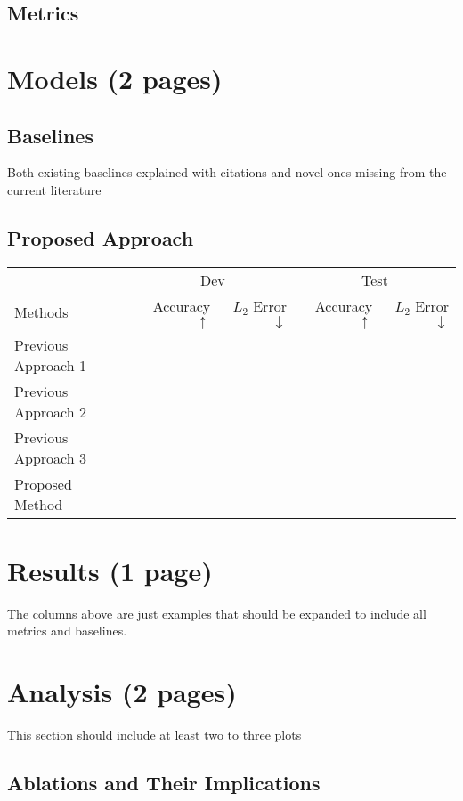 \documentclass[11pt,a4paper]{article}
\begin{document}



\subsection{Metrics}

\clearpage
\section{Models (2 pages)}

\subsection{Baselines}
Both existing baselines explained with citations and novel ones missing from the current literature

\subsection{Proposed Approach}

\clearpage
\begin{table*}[t]
\centering
\begin{tabular}{lrrrr}
\toprule
                            & \multicolumn{2}{c}{Dev} & \multicolumn{2}{c}{Test}\\
Methods                     & Accuracy $\uparrow$ & $L_2$ Error $\downarrow$ & Accuracy $\uparrow$ & $L_2$ Error $\downarrow$ \\
\midrule
Previous Approach 1 \cite{} & & & & \\
Previous Approach 2 \cite{} & & & & \\
Previous Approach 3 \cite{} & & & & \\
\midrule
Proposed Method             & & & & \\
\bottomrule
\end{tabular}
\end{table*}
\section{Results (1 page)}
The columns above are just examples that should be expanded to include all metrics and baselines.

\clearpage
\section{Analysis (2 pages)}
This section should include at least two to three plots
\subsection{Ablations and Their Implications}
\end{document}
